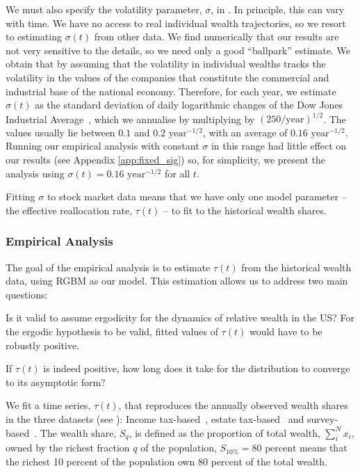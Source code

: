 We must also specify the volatility parameter, $\sigma$, in . In principle, this can vary with time. We have no access to real individual wealth trajectories, so we resort to estimating $\sigma\left(t\right)$ from other data. We find numerically that our results are not very sensitive to the details, so we need only a good ``ballpark'' estimate. We obtain that by assuming that the volatility in individual wealths tracks the volatility in the values of the companies that constitute the commercial and industrial base of the national economy. Therefore, for each year, we estimate $\sigma\left(t\right)$ as the standard deviation of daily logarithmic changes of the Dow Jones Industrial Average~\cite{Quandl2016}, which we annualise by multiplying by $\left(250/\text{year}\right)^{1/2}$. The values usually lie between $0.1$ and $0.2 \text{ year}^{-1/2}$, with an average of $0.16\text{ year}^{-1/2}$. Running our empirical analysis with constant $\sigma$ in this range had little effect on our results (see Appendix \ref{app:fixed_sig}) so, for simplicity, we present the analysis using $\sigma\left(t\right)=0.16\text{ year}^{-1/2}$ for all $t$.

Fitting $\sigma$ to stock market data means that we have only one model parameter -- the effective reallocation rate, $\tau\left(t\right)$ -- to fit to the historical wealth shares.

\subsubsection{Empirical Analysis}\label{sec:analysis}

The goal of the empirical analysis is to estimate $\tau\left(t\right)$ from the historical wealth data, using RGBM as our model. This estimation allows us to address two main questions:

\bi
\item[1.] Is it valid to assume ergodicity for the dynamics of relative wealth in the US? For the ergodic hypothesis to be valid, fitted values of $\tau\left(t\right)$ would have to be robustly positive.
\item[2.] If $\tau\left(t\right)$ is indeed positive, how long does it take for the distribution to converge to its asymptotic form?
\ei


We fit a time series, $\tau\left(t\right)$, that reproduces the annually observed wealth shares in the three datasets (see ): Income tax-based~\cite{SaezZucman2014,WID2017}, estate tax-based~\cite{kopczuk2004top} and survey-based~\cite{bricker2016measuring2}. The wealth share, $S_q$, is defined as the proportion of total wealth, $\sum_i^N x_i$, owned by the richest fraction $q$ of the population, \eg $S_{10\%}=80 \text{ percent}$ means that the richest 10 percent of the population own 80 percent of the total wealth.

